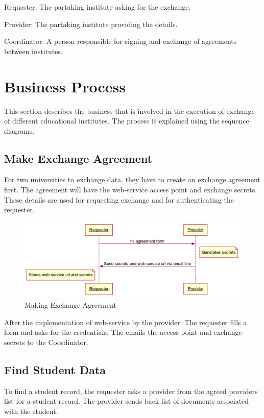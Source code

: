 \documentclass[12pt,a4paper,oneside]{book}
\begin{document}
Requester: The partaking institute asking for the exchange.

Provider: The partaking institute providing the details.

Coordinator: A person responsible for signing and exchange of agreements between institutes.

\section{Business Process}\label{s-business_process}
This section describes the business that is involved in the execution of exchange of different educational institutes. The process is explained using the sequence diagrams.

    \subsection{Make Exchange Agreement}
    For two universities to exchange data, they have to create an exchange agreement first. The agreement will have the web-service access point and exchange secrets. These details are used for requesting exchange and for authenticating the requester.

\begin{figure}[!htp]
  \centering
  \includegraphics[width=14cm]{sq_agreement.png}
  \caption{Making Exchange Agreement}
  \label{fig:sq_agreement}
\end{figure}


After the implementation of web-service by the provider. The requester fills a form and asks for the credentials. The emails the access point and exchange secrets to the Coordinator.

    \subsection{Find Student Data}
    To find a student record, the requester asks a provider from the agreed providers list for a student record. The provider sends back list of documents associated with the student.
\end{document}

